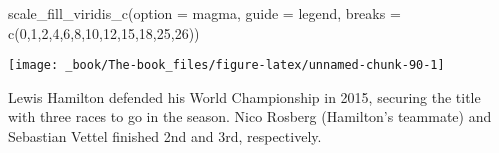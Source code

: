 \documentclass[
]{book}
\newenvironment{Shaded}{\begin{snugshade}}{\end{snugshade}}
\newcommand{\AttributeTok}[1]{\textcolor[rgb]{0.77,0.63,0.00}{#1}}
\newcommand{\DecValTok}[1]{\textcolor[rgb]{0.00,0.00,0.81}{#1}}
\newcommand{\FunctionTok}[1]{\textcolor[rgb]{0.00,0.00,0.00}{#1}}
\newcommand{\NormalTok}[1]{#1}
\newcommand{\StringTok}[1]{\textcolor[rgb]{0.31,0.60,0.02}{#1}}
\begin{document}
\begin{Shaded}
\begin{Highlighting}[]
  \FunctionTok{scale\_fill\_viridis\_c}\NormalTok{(}\AttributeTok{option =} \StringTok{\textquotesingle{}magma\textquotesingle{}}\NormalTok{,}
                       \AttributeTok{guide =} \StringTok{\textquotesingle{}legend\textquotesingle{}}\NormalTok{,}
                       \AttributeTok{breaks =} \FunctionTok{c}\NormalTok{(}\DecValTok{0}\NormalTok{,}\DecValTok{1}\NormalTok{,}\DecValTok{2}\NormalTok{,}\DecValTok{4}\NormalTok{,}\DecValTok{6}\NormalTok{,}\DecValTok{8}\NormalTok{,}\DecValTok{10}\NormalTok{,}\DecValTok{12}\NormalTok{,}\DecValTok{15}\NormalTok{,}\DecValTok{18}\NormalTok{,}\DecValTok{25}\NormalTok{,}\DecValTok{26}\NormalTok{))}
\end{Highlighting}
\end{Shaded}

\begin{center}\texttt{[image: \_book/The-book\_files/figure-latex/unnamed-chunk-90-1]} \end{center}

Lewis Hamilton defended his World Championship in 2015, securing the title with three races to go in the season. Nico Rosberg (Hamilton's teammate) and Sebastian Vettel finished 2nd and 3rd, respectively.
\end{document}

